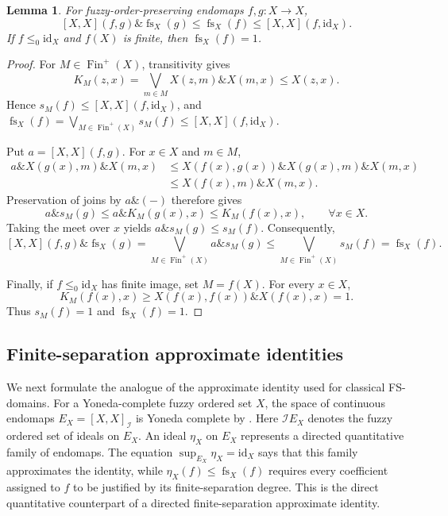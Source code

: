 \documentclass[preprint,3p,times]{elsarticle}
\newtheorem{lemma}[lemma]{Lemma}
\theoremstyle{definition}
\theoremstyle{remark}
\newcommand{\I}{\mathcal{I}}
\newcommand{\id}{\mathrm{id}}
\newcommand{\supop}{\operatorname{sup}}
\newcommand{\fs}{\operatorname{fs}}
\newcommand{\Finp}{\operatorname{Fin}^{+}}
\newcommand{\tn}{\mathbin{\&}}
\numberwithin{equation}{section}
\begin{document}
\begin{lemma}\label{lem:fs-basic}
For fuzzy-order-preserving endomaps \(f,g\colon X\to X\),
\begin{equation}\label{eq:fs-lower}
  [X,X](f,g)\tn\fs_X(g)\leq\fs_X(f)
  \leq[X,X](f,\id_X).
\end{equation}
If \(f\leq_0\id_X\) and \(f(X)\) is finite, then \(\fs_X(f)=1\).
\end{lemma}


\begin{proof}
For \(M\in\Finp(X)\), transitivity gives
\[
 K_M(z,x)=\bigvee_{m\in M}X(z,m)\tn X(m,x)\leq X(z,x).
\]
Hence \(s_M(f)\leq[X,X](f,\id_X)\), and 
\(\fs_X(f)=\bigvee_{M\in\Finp(X)}s_M(f)
\leq[X,X](f,\id_X)\).

Put \(a=[X,X](f,g)\). For \(x\in X\) and \(m\in M\),
\begin{align*}
 a\tn X(g(x),m)\tn X(m,x) &\leq X(f(x),g(x))\tn X(g(x),m)\tn X(m,x)\\
                          &\leq X(f(x),m)\tn X(m,x).
\end{align*}
Preservation of joins by \(a\tn(-)\) therefore gives
\[
 a\tn s_M(g)\leq a\tn K_M(g(x),x)\leq K_M(f(x),x),
 \qquad \forall x\in X.
\]
Taking the meet over \(x\) yields \(a\tn s_M(g)\leq s_M(f)\). Consequently,
\[
 [X,X](f,g)\tn\fs_X(g)
 =\bigvee_{M\in\Finp(X)}a\tn s_M(g)
 \leq\bigvee_{M\in\Finp(X)}s_M(f)=\fs_X(f).
\]

Finally, if \(f\leq_0\id_X\) has finite image, set \(M=f(X)\). For every \(x\in X\),
\[
 K_M(f(x),x)\geq X(f(x),f(x))\tn X(f(x),x)=1.
\]
Thus \(s_M(f)=1\) and \(\fs_X(f)=1\).
\end{proof}

\subsection{Finite-separation approximate identities}
We next formulate the analogue of the approximate identity used for classical FS-domains. For a Yoneda-complete fuzzy ordered set \(X\), the space
of continuous endomaps
\(
E_X=[X,X]_{\I}
\)
is Yoneda complete by .
Here \(\I E_X\) denotes the fuzzy ordered set of ideals on \(E_X\).
An ideal \(\eta_X\) on \(E_X\) represents a directed quantitative family of endomaps. The equation \(\supop_{E_X}\eta_X=\id_X\) says that this family approximates the identity, while \(\eta_X(f)\leq\fs_X(f)\) requires every coefficient assigned to \(f\) to be justified by its finite-separation degree. This is the direct quantitative counterpart of a directed finite-separation approximate identity.
\end{document}

